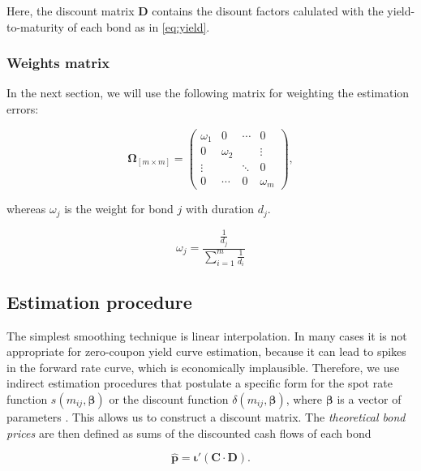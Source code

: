 Here, the discount matrix $\bm{D}$ contains the disount factors calulated with the yield-to-maturity of each bond as in \eqref{eq:yield}.

\subsubsection*{Weights matrix}

In the next section, we will use the following matrix for weighting the estimation errors:


\begin{equation*}\label{weights}
    \bm{\Omega}_{\left[m\times m\right]}= \begin{pmatrix}
 \omega_1 & 0 &\cdots  &0  \\
 0 & \omega_2 &  & \vdots \\
 \vdots &  & \ddots & 0 \\
 0 &\cdots  &0  & \omega_m
\end{pmatrix},
\end{equation*}


whereas $\omega_j$ is the weight for bond $j$ with duration $d_j$.

\begin{equation}
\label{eq:durationweight}
    \omega_j=\frac{\frac{1}{d_j}}{\sum_{i=1}^m\frac{1}{d_i}}
\end{equation}


\subsection{Estimation procedure}
\label{sec:estimation}

The simplest smoothing technique is linear interpolation. In many cases it is not appropriate for zero-coupon yield curve estimation, because it can lead to spikes in the forward rate curve, which is economically implausible. Therefore, we use indirect estimation procedures that postulate a specific form for the spot rate function $s(m_{ij}, \bm{\beta})$ or the discount function $\delta(m_{ij}, \bm{\beta})$, where $\bm{\beta}$ is a vector of parameters \citep[see, e.g.][]{Martellini2003}. This allows us to construct a discount matrix. The \emph{theoretical bond prices} are then defined as sums of the discounted cash flows of each bond

\begin{equation}
  \label{eq:theorprices}
  \bm{\hat{p}} = \bm{\iota}'(\bm{C}\cdot\bm{D}).
\end{equation}



